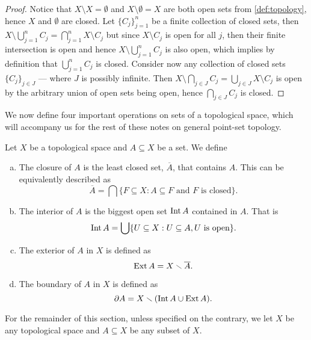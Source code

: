 \begin{proof}
Notice that \(X \setminus X = \emptyset\) and \(X \setminus \emptyset = X\) are
both open sets from \cref{def:topology}, hence \(X\) and \(\emptyset\) are
closed. Let \(\{C_{j}\}_{j=1}^n\) be a finite collection of closed sets, then
\(X \setminus \bigcup_{j=1}^n C_j = \bigcap_{j=1}^n X \setminus C_j\) but since
\(X \setminus C_j\) is open for all \(j\), then their finite intersection is
open and hence \(X \setminus \bigcup_{j=1}^n C_j\) is also open, which implies
by definition that \(\bigcup_{j=1}^n C_j\) is closed. Consider now any
collection of closed sets \(\{C_{j}\}_{j \in J}\) --- where \(J\) is possibly
infinite. Then \(X \setminus \bigcap_{j \in J} C_j = \bigcup_{j \in J} X
\setminus C_j\) is open by the arbitrary union of open sets being open, hence
\(\bigcap_{j \in J} C_j\) is closed.
\end{proof}

We now define four important operations on sets of a topological space, which
will accompany us for the rest of these notes on general point-set topology.

\begin{definition}
Let \(X\) be a topological space and \(A \subseteq X\) be a set. We define
\begin{enumerate}[(a)]\setlength\itemsep{0em}
\item\label{def: closure}
  The closure of \(A\) is the least closed set, \(\overline A\), that
  contains \(A\). This can be equivalently described as
  \[
    \overline A = \bigcap \{F \subseteq X : A \subseteq F \text{ and } F
    \text{ is closed}\}.
  \]

\item\label{def: interior}
  The interior of \(A\) is the biggest open set \(\operatorname{Int} A\) contained in
  \(A\). That is
    \[
      \operatorname{Int} A = \bigcup \{U \subseteq X : U \subseteq A, U \text{ is open}\}.
  \]

\item\label{def: exterior}
  The exterior of \(A\) in \(X\) is defined as
  \[
    \operatorname{Ext} A = X \smallsetminus \overline A.
  \]

\item\label{def: boundary}
  The boundary of \(A\) in \(X\) is defined as
  \[
    \partial A = X \smallsetminus (\operatorname{Int} A \cup \operatorname{Ext} A).
  \]
\end{enumerate}
\end{definition}

\begin{remark}
For the remainder of this section, unless specified on the contrary, we let
\(X\) be any topological space and \(A \subseteq X\) be any subset of \(X\).
\end{remark}

